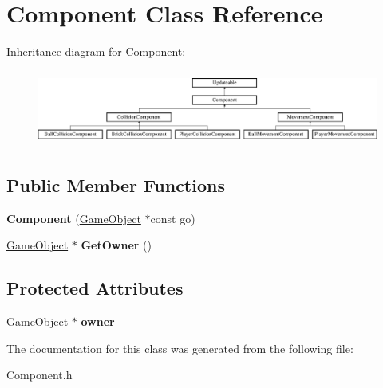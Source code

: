 \hypertarget{class_component}{}\section{Component Class Reference}
\label{class_component}
Inheritance diagram for Component\+:\begin{figure}[H]
\begin{center}
\leavevmode
\includegraphics[height=2.516854cm]{class_component}
\end{center}
\end{figure}
\subsection*{Public Member Functions}
\begin{DoxyCompactItemize}
\item 
\hypertarget{class_component_aed6d43c7dda98b169f49e0485303d9f1}{}{\bfseries Component} (\hyperlink{class_game_object}{Game\+Object} $\ast$const go)\label{class_component_aed6d43c7dda98b169f49e0485303d9f1}

\item 
\hypertarget{class_component_a831c307a54d6ca9e5a75e2fc72770e63}{}\hyperlink{class_game_object}{Game\+Object} $\ast$ {\bfseries Get\+Owner} ()\label{class_component_a831c307a54d6ca9e5a75e2fc72770e63}

\end{DoxyCompactItemize}
\subsection*{Protected Attributes}
\begin{DoxyCompactItemize}
\item 
\hypertarget{class_component_a715fc40771d21d6d43d8209dd5c9810a}{}\hyperlink{class_game_object}{Game\+Object} $\ast$ {\bfseries owner}\label{class_component_a715fc40771d21d6d43d8209dd5c9810a}

\end{DoxyCompactItemize}


The documentation for this class was generated from the following file\+:\begin{DoxyCompactItemize}
\item 
Component.\+h\end{DoxyCompactItemize}

